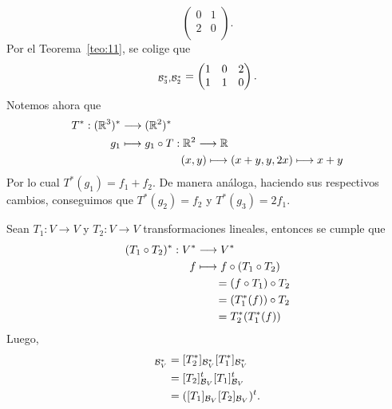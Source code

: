 \documentclass[12pt,a4paper]{book}
\begin{document}
\begin{ejemplo}
\begin{equation*}
\begin{pmatrix}
            0 & 1\\
            2 & 0\\
        \end{pmatrix}.
        \end{equation*}
        Por el Teorema~\ref{teo:11}, se colige que
        \begin{equation*}
        [T^{*}]_{\BB^{*}_{3}, \BB_{2}^{*}} = 
        \begin{pmatrix}
            1 & 0 & 2\\
            1 & 1 & 0\\
        \end{pmatrix}.
        \end{equation*}
        Notemos ahora que
        \begin{equation*}
            \begin{aligned}
                T^{*}: (\mathbb{R}^{3})^{*} & \longrightarrow (\mathbb{R}^{2})^{*} \\
                g_{1} & \longmapsto g_{1} \circ T: \mathbb{R}^{2} \longrightarrow \mathbb{R}\\
                &\hspace{1.9cm}   (x, y)\longmapsto (x + y, y, 2x) \longmapsto x + y
            \end{aligned}
        \end{equation*}
        Por lo cual $T^{*}(g_{1}) = f_{1} + f_{2}$. De manera análoga, haciendo sus respectivos cambios, conseguimos que $T^{*}(g_{2}) = f_{2}$ y $T^{*}(g_{3}) = 2f_{1}$.
    \end{ejemplo}


    Sean $T_{1}: V \to V$ y $T_{2}: V \to V$ transformaciones lineales, entonces se cumple que
    \begin{align*}
        (T_{1} \circ T_{2})^{*}: V^{*} & \longrightarrow V^{*}\\
        f & \longmapsto f \circ(T_{1} \circ T_{2})\\
        & \hspace{0.6cm} = (f \circ T_{1}) \circ T_{2}\\
        & \hspace{0.6cm} = (T_{1}^{*}(f)) \circ T_{2}\\
        & \hspace{0.6cm} = T^{*}_{2}(T_{1}^{*}(f))
    \end{align*}
    Luego,
    \begin{align*}
        [T_{2}^{*} \circ T_{1}^{*}]_{\BB_{V}^{*}} & = [T_{2}^{*}]_{\BB_{V}^{*}}[T_{1}^{*}]_{\BB_{V}^{*}}\\
        & = [T_{2}]^{t}_{\BB_{V}}[T_{1}]^{t}_{\BB_{V}}\\
        & = ([T_{1}]_{\BB_{V}}[T_{2}]_{\BB_{V}})^{t}.
    \end{align*}
\end{document}
